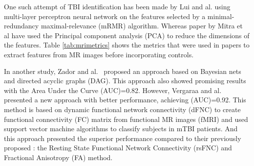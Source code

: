 \documentclass[runningheads]{llncs}
\begin{document}
One such attempt of TBI identification has been made by Lui and al. \cite{lui_classification_2014} using multi-layer perceptron neural network on the features selected by a minimal-redundancy maximal-relevance (mRMR) algorithm. Whereas paper \cite{mitra_statistical_2016} by Mitra et al have used the Principal component analysis (PCA) to reduce the dimensions of the features. Table \ref{tab:mrimetrics} shows the metrics that were used in papers \cite{lui_classification_2014,vergara_dynamic_2018,minaee_mtbi_2019,mitra_statistical_2016,vergara_detection_2016} to extract features from MR images before incorporating controls.

In another study, Zador and al.~\cite{zador_predictors_2016} proposed an approach based on Bayesian nets and directed acyclic graphs (DAG). This approach also showed promising results with the Area Under the Curve (AUC)=0.82. However, Vergaraa and al.~\cite{vergara_dynamic_2018} presented a new approach with better performance, achieving (AUC)=0.92. This method is based on dynamic functional network connectivity (dFNC) to create functional connectivity (FC) matrix from functional MR images (fMRI) and used support vector machine algorithms to classify subjects in mTBI patients. And this approach presented the superior performance compared to their previously proposed \cite{vergara_detection_2016}: the Resting State Functional Network Connectivity (rsFNC) and Fractional Anisotropy (FA) method. 
\end{document}
